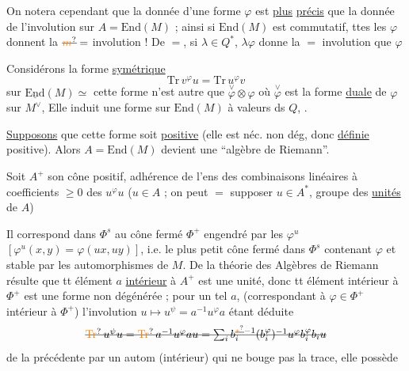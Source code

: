 On notera cependant que la donnée d'une
forme $\varphi$  est \uline{plus} \uline{précis} que la donnée de
l'involution sur $A=\mathrm{End}(M)$ ; ainsi si $\mathrm{End}(M)$
est commutatif, ttes les $\varphi$ donnent la
$\deleted{\unsure{m}}=$ involution ! De $=$, si $\lambda\in Q^*$, $\lambda\varphi$ donne
la $=$ involution que $\varphi$

Considérons la forme \uline{symétrique}
\[
\mathrm{Tr}\,v^\varphi u=\mathrm{Tr}\,u^\varphi v
\]
sur   $\underline{\mathrm{End}}(M)\simeq$  
cette forme n'est autre que $\overset{\vee}{\varphi}\otimes\varphi$ où
$\overset{\vee}{\varphi}$ est la forme \uline{duale} de $\varphi$ sur $M^\vee$,  
Elle induit une forme sur
$\mathrm{End}(M)$ à valeurs ds $Q$, .

\uline{Supposons} que cette forme soit 
\uline{positive} (elle est néc. non dég, donc \uline{définie}
positive).  Alors
$A=\mathrm{End}(M)$ devient une ``algèbre de Riemann''.

Soit $A^+$ son cône positif,  adhérence
de l'ens des combinaisons linéaires à
coefficients $\geq0$ des $u^\varphi u$ ($u\in A$ ; on
peut $=$ supposer $u\in A^*$, groupe des \uline{unités} de $A$)

Il correspond dans $\Phi^s$ au cône fermé $\Phi^+$
engendré par les $\varphi^u$ $[\varphi^u(x,y)=\varphi(ux,uy)]$,
i.e. le plus petit cône fermé dans $\Phi^s$
contenant $\varphi$ et stable par les automorphismes
de $M$.  De la théorie des
Algèbres de Riemann résulte que tt
élément $a$ \uline{intérieur} à $A^+$ est une
unité, donc tt élément intérieur à $\Phi^+$
est une forme non dégénérée ;  
pour un tel $a$,  (correspondant à
$\varphi\in\Phi^+$ intérieur à $\Phi^+$) l'involution
$u\mapsto u^\psi=a^{-1}u^\varphi a$  étant déduite
\[
\deleted{\unsure{\mathrm{Tr}}\,u^\psi u=\unsure{\mathrm{Tr}}\,a^{-1}u^\varphi au=\sum_i b_i^{\deleted{\unsure{*}}-1}(b_i^\varphi)^{-1}u^\varphi b_i^\varphi b_i u}
\]
de la précédente par un autom (intérieur)
qui ne bouge pas la trace, elle  possède

